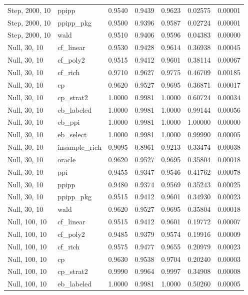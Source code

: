 \begin{longtable}{llrrrrr}
Step, 2000, 10 & ppipp & 0.9540 & 0.9439 & 0.9623 & 0.02575 & 0.00001 \\
Step, 2000, 10 & ppipp\_pkg & 0.9500 & 0.9396 & 0.9587 & 0.02724 & 0.00001 \\
Step, 2000, 10 & wald & 0.9510 & 0.9406 & 0.9596 & 0.04383 & 0.00000 \\
Null, 30, 10 & cf\_linear & 0.9530 & 0.9428 & 0.9614 & 0.36938 & 0.00045 \\
Null, 30, 10 & cf\_poly2 & 0.9515 & 0.9412 & 0.9601 & 0.38114 & 0.00067 \\
Null, 30, 10 & cf\_rich & 0.9710 & 0.9627 & 0.9775 & 0.46709 & 0.00185 \\
Null, 30, 10 & cp & 0.9620 & 0.9527 & 0.9695 & 0.36871 & 0.00017 \\
Null, 30, 10 & cp\_strat2 & 1.0000 & 0.9981 & 1.0000 & 0.60724 & 0.00034 \\
Null, 30, 10 & eb\_labeled & 1.0000 & 0.9981 & 1.0000 & 0.99144 & 0.00056 \\
Null, 30, 10 & eb\_ppi & 1.0000 & 0.9981 & 1.0000 & 1.00000 & 0.00000 \\
Null, 30, 10 & eb\_select & 1.0000 & 0.9981 & 1.0000 & 0.99990 & 0.00005 \\
Null, 30, 10 & insample\_rich & 0.9095 & 0.8961 & 0.9213 & 0.33474 & 0.00038 \\
Null, 30, 10 & oracle & 0.9620 & 0.9527 & 0.9695 & 0.35804 & 0.00018 \\
Null, 30, 10 & ppi & 0.9455 & 0.9347 & 0.9546 & 0.41762 & 0.00078 \\
Null, 30, 10 & ppipp & 0.9480 & 0.9374 & 0.9569 & 0.35243 & 0.00025 \\
Null, 30, 10 & ppipp\_pkg & 0.9515 & 0.9412 & 0.9601 & 0.34930 & 0.00023 \\
Null, 30, 10 & wald & 0.9620 & 0.9527 & 0.9695 & 0.35804 & 0.00018 \\
Null, 100, 10 & cf\_linear & 0.9515 & 0.9412 & 0.9601 & 0.19772 & 0.00007 \\
Null, 100, 10 & cf\_poly2 & 0.9485 & 0.9379 & 0.9574 & 0.19916 & 0.00009 \\
Null, 100, 10 & cf\_rich & 0.9575 & 0.9477 & 0.9655 & 0.20979 & 0.00023 \\
Null, 100, 10 & cp & 0.9630 & 0.9538 & 0.9704 & 0.20240 & 0.00003 \\
Null, 100, 10 & cp\_strat2 & 0.9990 & 0.9964 & 0.9997 & 0.34908 & 0.00008 \\
Null, 100, 10 & eb\_labeled & 1.0000 & 0.9981 & 1.0000 & 0.50260 & 0.00005 \\

\end{longtable}
